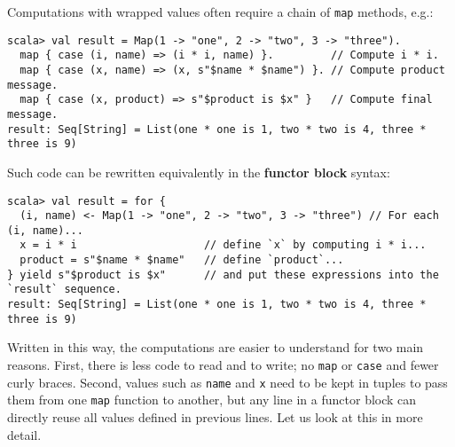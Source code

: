 Computations with wrapped values often require a chain of \lstinline!map!
methods, e.g.:
\begin{lstlisting}
scala> val result = Map(1 -> "one", 2 -> "two", 3 -> "three").
  map { case (i, name) => (i * i, name) }.         // Compute i * i.
  map { case (x, name) => (x, s"$name * $name") }. // Compute product message.
  map { case (x, product) => s"$product is $x" }   // Compute final message.
result: Seq[String] = List(one * one is 1, two * two is 4, three * three is 9)
\end{lstlisting}
Such code can be rewritten equivalently in the \textbf{functor
block} syntax:
\begin{lstlisting}
scala> val result = for {
  (i, name) <- Map(1 -> "one", 2 -> "two", 3 -> "three") // For each (i, name)...
  x = i * i                    // define `x` by computing i * i...
  product = s"$name * $name"   // define `product`...
} yield s"$product is $x"      // and put these expressions into the `result` sequence.
result: Seq[String] = List(one * one is 1, two * two is 4, three * three is 9) 
\end{lstlisting}
Written in this way, the computations are easier to understand for
two main reasons. First, there is less code to read and to write;
no \lstinline!map! or \lstinline!case! and fewer curly braces. Second,
values such as \lstinline!name! and \lstinline!x! need to be kept
in tuples to pass them from one \lstinline!map! function to another,
but any line in a functor block can directly reuse all values defined
in previous lines. Let us look at this in more detail.

